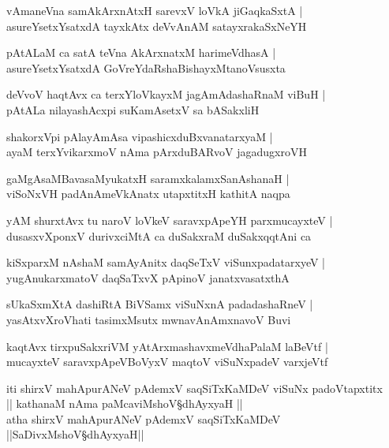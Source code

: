 \begin{shloka}
vAmaneVna samAkArxnAtxH sarevxV loVkA jiGaqkaSxtA |\\ asureYsetxYsatxdA tayxkAtx deVvAnAM satayxrakaSxNeYH
\end{shloka}

\begin{shloka}
pAtALaM ca satA teVna AkArxnatxM harimeVdhasA |\\ asureYsetxYsatxdA GoVreYdaRshaBishayxMtanoVsusxta
\end{shloka}

\begin{shloka}
deVvoV haqtAvx ca terxYloVkayxM jagAmAdashaRnaM viBuH |\\ pAtALa nilayashAcxpi suKamAsetxV sa bASakxliH
\end{shloka}

\begin{shloka}
shakorxVpi pAlayAmAsa vipashicxduBxvanatarxyaM |\\ ayaM terxYvikarxmoV nAma pArxduBARvoV jagadugxroVH
\end{shloka}

\begin{shloka}
gaMgAsaMBavasaMyukatxH saramxkalamxSanAshanaH |\\ viSoNxVH padAnAmeVkAnatx utapxtitxH kathitA naqpa 
\end{shloka}

\begin{shloka}
yAM shurxtAvx tu naroV loVkeV saravxpApeYH parxmucayxteV |\\dusasxvXponxV durivxciMtA ca duSakxraM duSakxqqtAni ca
\end{shloka}

\begin{shloka}
kiSxparxM nAshaM samAyAnitx daqSeTxV viSunxpadatarxyeV |\\ yugAnukarxmatoV daqSaTxvX pApinoV janatxvasatxthA
\end{shloka}

\begin{shloka}
sUkaSxmXtA dashiRtA BiVSamx viSuNxnA padadashaRneV |\\ yasAtxvXroVhati tasimxMsutx mwnavAnAmxnavoV Buvi
\end{shloka}

\begin{shloka}
kaqtAvx tirxpuSakxriVM yAtArxmashavxmeVdhaPalaM laBeVtf |\\ mucayxteV saravxpApeVBoVyxV maqtoV viSuNxpadeV varxjeVtf
\end{shloka}
\begin{center}
iti shirxV mahApurANeV pAdemxV saqSiTxKaMDeV viSuNx padoVtapxtitx\\
|| kathanaM nAma paMcaviMshoV\S dhAyxyaH ||\\[10pt]
\large{atha shirxV mahApurANeV pAdemxV saqSiTxKaMDeV}\\
||SaDivxMshoV\S dhAyxyaH||
\end{center}


